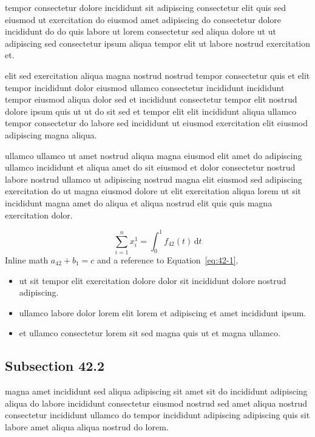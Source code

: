 \documentclass{article}
\begin{document}
tempor consectetur dolore incididunt sit adipiscing consectetur elit quis sed eiusmod ut exercitation do eiusmod amet adipiscing do consectetur dolore incididunt do do quis labore ut lorem consectetur sed aliqua dolore ut ut adipiscing sed consectetur ipsum aliqua tempor elit ut labore nostrud exercitation et.

elit sed exercitation aliqua magna nostrud nostrud tempor consectetur quis et elit tempor incididunt dolor eiusmod ullamco consectetur incididunt incididunt tempor eiusmod aliqua dolor sed et incididunt consectetur tempor elit nostrud dolore ipsum quis ut ut do sit sed et tempor elit elit incididunt aliqua ullamco tempor consectetur do labore sed incididunt ut eiusmod exercitation elit eiusmod adipiscing magna aliqua.

ullamco ullamco ut amet nostrud aliqua magna eiusmod elit amet do adipiscing ullamco incididunt et aliqua amet do sit eiusmod et dolor consectetur nostrud labore nostrud ullamco ut adipiscing nostrud magna elit eiusmod sed adipiscing exercitation do ut magna eiusmod dolore ut elit exercitation aliqua lorem ut sit incididunt magna amet do aliqua et aliqua nostrud elit quis quis magna exercitation dolor.

\begin{equation}\label{eq:42-1}
  \sum_{i=1}^{n} x_i^{1} = \int_0^1 f_{42}(t)\,\mathrm{d}t
\end{equation}
Inline math $a_{42} + b_{1} = c$ and a reference to Equation~\eqref{eq:42-1}.

\begin{itemize}
  \item ut sit tempor elit exercitation dolore dolor sit incididunt dolore nostrud adipiscing.
  \item ullamco labore dolor lorem elit lorem et adipiscing et amet incididunt ipsum.
  \item et ullamco consectetur lorem sit sed magna quis ut et magna ullamco.
\end{itemize}

\subsection{Subsection 42.2}\label{sec:42-2}
magna amet incididunt sed aliqua adipiscing sit amet sit do incididunt adipiscing aliqua do labore incididunt consectetur eiusmod nostrud sed amet aliqua nostrud consectetur incididunt ullamco do tempor incididunt adipiscing adipiscing quis sit labore amet aliqua aliqua nostrud do lorem.
\end{document}
